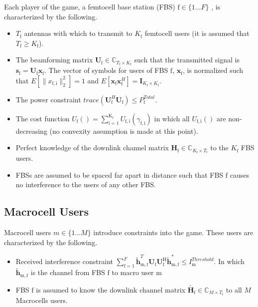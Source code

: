 \documentclass[12pt,a4paper]{report}
\begin{document}
Each player of the game, a femtocell base station (FBS) $\text{f} \in \{1 ... F\}$ , is characterized by the following.
\begin{itemize}
\item 
$T_{\text{f}}$ antennas with which to transmit to $K_{\text{f}}$ femtocell users (it is assumed that $T_{\text{f}} \geq K_{\text{f}}$).
\\
\item 
	The beamforming matrix $\mathbf{U}_{\mathrm{f}} \in \mathbb{C}_{T_{\text{f}} \times K_{\text{f}}}$ such that the transmitted 		
	signal is $\mathbf{s}_{\mathrm{f}
	}= \mathbf{U_{\mathrm{f}}}\mathbf{x_{\mathrm{f}}}$. The 		
	vector of symbols for users of FBS $\text{f}$, $\mathbf{x_{\mathrm{f}}}$, is  normalized such that $E[\|x_{\mathrm{f,i}}
	\|_2^2]=1$ and $E[\mathbf{x}_{\mathrm{f}}\mathbf{x}_{\mathrm{f}}^H]=\mathbf{I}_{K_{\text{f}} \times K_{\text{f}}}$.
\\
\item 
	The power constraint $trace(\mathbf{U}_{\text{f}}^H\mathbf{U}_{\text{f}}) \leq P^{Total}_{\text{f}} $.

\item 
	The cost function $U_{\text{f}}() =
	\sum_{\mathrm{i=1}}^{\mathrm{K_{\text{f}}}}
    	 U_{\mathrm{f,i}}(\gamma_{\mathrm{f,i}}) $
    	in which all $U_{\mathrm{f,i}}()$ are non-decreasing (no convexity assumption is made at this point).

\item 
	Perfect knowledge of the downlink channel matrix $\mathbf{H_\mathrm{f}} \in \mathbb{C}_{K_{\text{f}} \times T_{\text{f}}} $ to the $K_{\text{f}}$ FBS users.
\\
\item
	 FBSs are assumed to be spaced far apart in distance such that FBS $\text{f}$ 
	 causes no interference to the users of any other FBS.
\end{itemize}

\subsection{Macrocell Users}
Macrocell users $m \in \{1 ... M\}$ introduce constraints into the game. These users are characterized by the following.

\begin{itemize}
\item 
	Received interference constraint
	$\sum^F_{\text{f}=1} \mathbf{\tilde{h}}_{\mathrm{m,f}}^T  \mathbf{U_{\mathrm{f}}} 						
	\mathbf{U_{\mathrm{f}}^{\mathrm{H}}} \mathbf{\tilde{h}_{\mathrm{m,f}}^*} \leq I^{Threshold}		
	_{\mathrm{m}} $. In which $\mathbf{\tilde{h}}_{\mathrm{m,f}}$ is the channel from FBS $\text{f}$ to macro user $\text{m}$

\item 
	FBS $\text{f}$ is assumed to know the downlink channel matrix $\tilde{\mathbf{H}_{\mathrm{f}}} \in \mathbb{C}_{M \times T_{\text{f}}}$ to all $M$ Macrocells users.
\\
\end{itemize}
\end{document}
